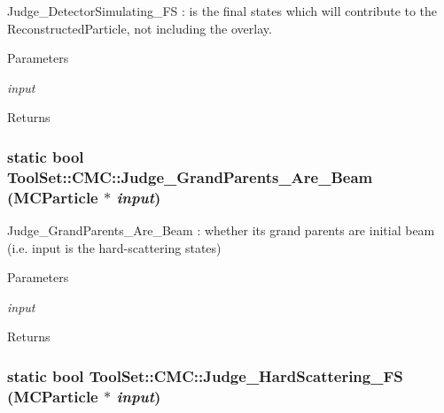 Judge\_\-DetectorSimulating\_\-FS : is the final states which will contribute to the ReconstructedParticle, not including the overlay. 
\begin{DoxyParams}{Parameters}
\item[{\em input}]\end{DoxyParams}
\begin{DoxyReturn}{Returns}

\end{DoxyReturn}
\hypertarget{classToolSet_1_1CMC_ad09856f709fff7320c382efd26a408e9}{
\subsubsection[{Judge\_\-GrandParents\_\-Are\_\-Beam}]{\setlength{\rightskip}{0pt plus 5cm}static bool ToolSet::CMC::Judge\_\-GrandParents\_\-Are\_\-Beam (MCParticle $\ast$ {\em input})}}
\label{classToolSet_1_1CMC_ad09856f709fff7320c382efd26a408e9}


Judge\_\-GrandParents\_\-Are\_\-Beam : whether its grand parents are initial beam (i.e. input is the hard-\/scattering states)


\begin{DoxyParams}{Parameters}
\item[{\em input}]\end{DoxyParams}
\begin{DoxyReturn}{Returns}

\end{DoxyReturn}
\hypertarget{classToolSet_1_1CMC_a85fbb7bf0ef846c3ae1dcfeb27853911}{
\subsubsection[{Judge\_\-HardScattering\_\-FS}]{\setlength{\rightskip}{0pt plus 5cm}static bool ToolSet::CMC::Judge\_\-HardScattering\_\-FS (MCParticle $\ast$ {\em input})}}
\label{classToolSet_1_1CMC_a85fbb7bf0ef846c3ae1dcfeb27853911}



